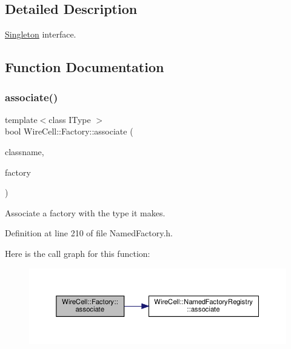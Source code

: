 \subsection{Detailed Description}
\hyperlink{class_wire_cell_1_1_singleton}{Singleton} interface. 

\subsection{Function Documentation}
\mbox{\label{namespace_wire_cell_1_1_factory_ae6f78981e3c42c6df31f8face901e982}} 
\subsubsection{\texorpdfstring{associate()}{associate()}}
{\footnotesize\ttfamily template$<$class I\+Type $>$ \\
bool Wire\+Cell\+::\+Factory\+::associate (\begin{DoxyParamCaption}\item[{const std\+::string \&}]{classname,  }\item[{\hyperlink{class_wire_cell_1_1_i_named_factory}{Wire\+Cell\+::\+I\+Named\+Factory} $\ast$}]{factory }\end{DoxyParamCaption})}



Associate a factory with the type it makes. 



Definition at line 210 of file Named\+Factory.\+h.

Here is the call graph for this function\+:
\nopagebreak
\begin{figure}[H]
\begin{center}
\leavevmode
\includegraphics[width=350pt]{namespace_wire_cell_1_1_factory_ae6f78981e3c42c6df31f8face901e982_cgraph}
\end{center}
\end{figure}
\mbox{\label{namespace_wire_cell_1_1_factory_abfb60a87055b2837f69e65cd27d9cb26}} 
